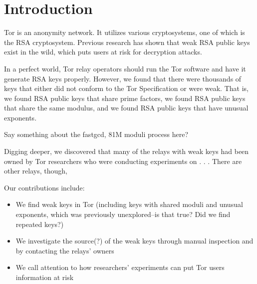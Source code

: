 \section{Introduction}
Tor is an anonymity network.  It utilizes various cryptosystems, 
one of which is the RSA cryptosystem.  Previous research has 
shown that weak RSA public keys exist in the wild, which puts users at 
risk for decryption attacks.  

In a perfect world, Tor relay operators should run the Tor software and have it 
generate RSA keys properly. However, we found that there were thousands of keys 
that either did not conform to the Tor Specification or were weak.  That is, we 
found RSA public keys that share prime factors, we found RSA public keys that 
share the same modulus, and we found RSA public keys that have unusual exponents.

Say something about the fastgcd, 81M moduli process here?

Digging deeper, we discovered that many of the relays with weak keys had been owned 
by Tor researchers who were conducting experiments on . . . There are other 
relays, though, 

Our contributions include:
\begin{itemize}
  \item We find weak keys in Tor (including keys with shared moduli 
    and unusual exponents, which was previously unexplored--is that true?
    Did we find repeated keys?)
  \item We investigate the source(?) of the weak keys through manual inspection and by 
    contacting the relays' owners
  \item We call attention to how researchers' experiments can put Tor users
    information at risk
\end{itemize}
